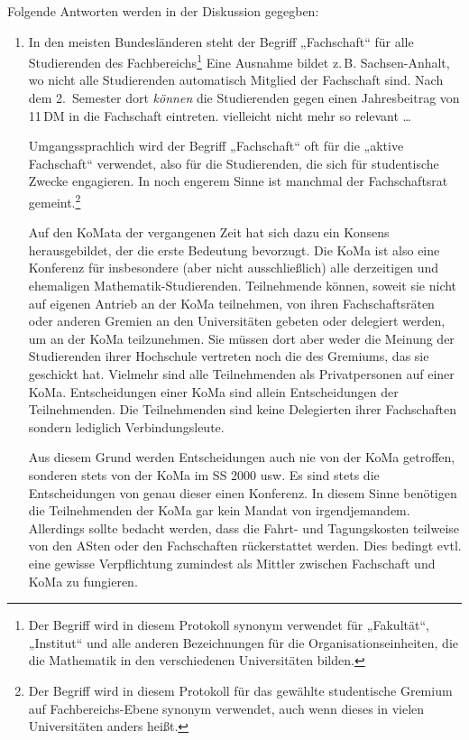 \documentclass{neulingsheft}
\begin{document}
{Folgende Antworten werden in der Diskussion gegegben:

\begin{enumerate}
\renewcommand\labelenumi{zu \theenumi:}
\item In den meisten Bundesländeren steht der Begriff „Fachschaft“ für alle
	Studierenden des Fachbereichs\footnote{Der Begriff wird in diesem
	Protokoll synonym verwendet für „Fakultät“, „Institut“ und alle anderen
	Bezeichnungen für die Organisationseinheiten, die die Mathematik in den
	verschiedenen Universitäten bilden.} Eine Ausnahme bildet z.\,B.
	Sachsen-Anhalt, wo nicht alle Studierenden automatisch Mitglied der
	Fachschaft sind. Nach dem 2.~Semester dort \emph{können} die
	Studierenden gegen einen Jahresbeitrag von 11\,DM in die Fachschaft
	eintreten. %
	vielleicht nicht mehr so relevant …

	Umgangssprachlich wird der Begriff „Fachschaft“ oft für die „aktive
	Fachschaft“ verwendet, also für die Studierenden, die sich für
	studentische Zwecke engagieren. In noch engerem Sinne ist manchmal der
	Fachschaftsrat gemeint.\footnote{Der Begriff wird in diesem Protokoll
	für das gewählte studentische Gremium auf Fachbereichs-Ebene synonym
	verwendet, auch wenn dieses in vielen Universitäten anders heißt.}

	Auf den KoMata der vergangenen Zeit hat sich dazu ein Konsens
	herausgebildet, der die erste Bedeutung bevorzugt. Die KoMa ist also
	eine Konferenz für insbesondere (aber nicht ausschließlich) alle
	derzeitigen und ehemaligen Mathematik-Studierenden. Teilnehmende
	können, soweit sie nicht auf eigenen Antrieb an der KoMa teilnehmen,
	von ihren Fachschaftsräten oder anderen Gremien an den Universitäten
	gebeten oder delegiert werden, um an der KoMa teilzunehmen. Sie müssen
	dort aber weder die Meinung der Studierenden ihrer Hochschule vertreten
	noch die des Gremiums, das sie geschickt hat. Vielmehr sind alle
	Teilnehmenden als Privatpersonen auf einer KoMa. Entscheidungen einer
	KoMa sind allein Entscheidungen der Teilnehmenden. Die Teilnehmenden
	sind keine Delegierten ihrer Fachschaften sondern lediglich
	Verbindungsleute.

	Aus diesem Grund werden Entscheidungen auch nie von der KoMa getroffen,
	sonderen stets von der KoMa im SS 2000 usw. Es sind stets die
	Entscheidungen von genau dieser einen Konferenz. In diesem Sinne
	benötigen die Teilnehmenden der KoMa gar kein Mandat von
	irgendjemandem. Allerdings sollte bedacht werden, dass die Fahrt- und
	Tagungskosten teilweise von den ASten oder den Fachschaften
	rückerstattet werden. Dies bedingt evtl.  eine gewisse Verpflichtung
	zumindest als Mittler zwischen Fachschaft und KoMa zu fungieren.


\end{enumerate}}
\end{document}
